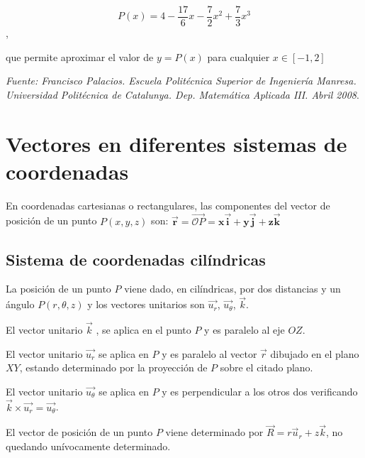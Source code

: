 \begin{equation*}
P(x)=4-\dfrac {17}{6} x -\dfrac 7 2 x^2+\dfrac 7 3 x^3	
\end{equation*},

que permite aproximar el valor de $y=P(x)$ para cualquier $x\in[-1,2]$



\vspace{10mm}


\noindent \scriptsize{\emph{Fuente: Francisco Palacios. Escuela Politécnica Superior de Ingeniería Manresa. Universidad Politécnica de Catalunya. Dep. Matemática Aplicada III. Abril 2008}}\normalsize{.}



\chapter{Vectores en diferentes sistemas de coordenadas}
 \label{VectoresDistintosSistemasCoordenadas}

En coordenadas cartesianas o rectangulares, las componentes del vector de posición de un punto $P(x,y,z)$ son: $\boldsymbol{ \vec r}=\overrightarrow{\mathcal O P}=\boldsymbol{ x\vec i+y\vec j+ z \vec k}$

\section{Sistema de coordenadas cilíndricas}

La posición de un punto $P$ viene dado, en cilíndricas, por dos distancias y un ángulo $P(r,\theta,z)$ y los vectores unitarios son $\overrightarrow{u_r}$,  $\overrightarrow{u_{\theta}}$, $\vec k$.


El vector unitario $\vec k$ , se aplica en el punto $P$ y es paralelo al eje $OZ$.

El vector unitario $\overrightarrow{u_r}$ se aplica en $P$ y es paralelo al vector $\vec r$ dibujado en el plano $XY$, estando determinado por la proyección de $P$ sobre el citado plano.

El vector unitario $\overrightarrow{u_{\theta}}$ se aplica en $P$ y es perpendicular a los otros dos verificando $\vec k \times \overrightarrow{u_r}=\overrightarrow{u_{\theta}}$.

El vector de posición de un punto $P$ viene determinado por $\vec R=r \vec u_r+z\vec k$, no quedando unívocamente determinado.


